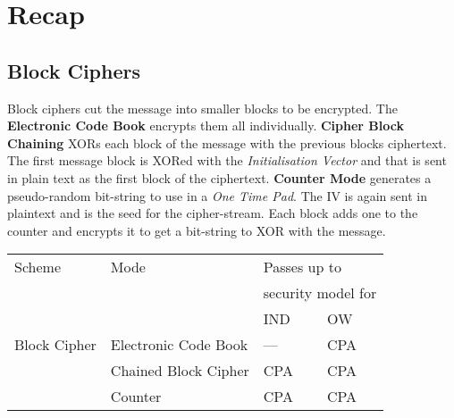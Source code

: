 \chapter{Recap}
	\section{Block Ciphers}
	Block ciphers cut the message into smaller blocks to be encrypted. The \textbf{Electronic Code Book} encrypts them all individually. \textbf{Cipher Block Chaining} XORs each block of the message with the previous blocks ciphertext. The first message block is XORed with the \textit{Initialisation Vector} and that is sent in plain text as the first block of the ciphertext. \textbf{Counter Mode} generates a pseudo-random bit-string to use in a \textit{One Time Pad}. The IV is again sent in plaintext and is the seed for the cipher-stream. Each block adds one to the counter and encrypts it to get a bit-string to XOR with the message.
	\begin{table}[htp!]
		\centering
		\begin{tabular}{llll}
			\toprule
			Scheme & Mode & \multicolumn{2}{l}{Passes up to}\\
			&& \multicolumn{2}{l}{security model for}\\\cmidrule(r){3-4}
			&& IND & OW\\\midrule
			Block Cipher & Electronic Code Book & --- & CPA\\
			& Chained Block Cipher & CPA & CPA\\
			& Counter & CPA & CPA\\
			\bottomrule
		\end{tabular}
	\end{table}